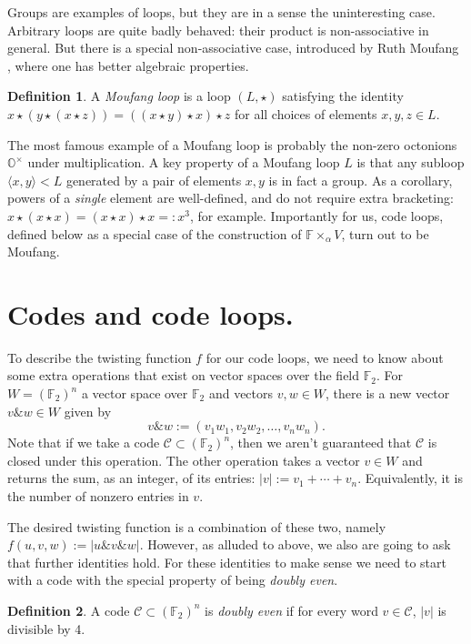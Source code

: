 \documentclass{article}
\theoremstyle{plain}
\theoremstyle{definition}
\newtheorem*{definition}{Definition}
\def \cC {\mathcal{C}}
\def \FF {\mathbb{F}}
\newcommand{\AND}{\mathbin{\texttt{\&}}}
\begin{document}
Groups are examples of loops, but they are in a sense the uninteresting case. Arbitrary loops are quite badly behaved: their product is non-associative in general. But there is a special non-associative case, introduced by Ruth Moufang \cite{Moufang}, where one has better algebraic properties.

\begin{definition}
A \emph{Moufang loop} is a loop $(L,\star)$ satisfying the identity $x \star (y \star (x \star z)) = ((x \star y) \star x) \star z$ for all choices of elements $x,y,z\in L$.
\end{definition}

The most famous example of a Moufang loop is probably the non-zero octonions $\mathbb{O}^\times$ under multiplication. A key property of a Moufang loop $L$ is that any subloop $\langle x,y\rangle < L$ generated by a pair of elements $x,y$ is in fact a group. As a corollary, powers of a \emph{single} element are well-defined, and do not require extra bracketing: $x\star (x \star x) = (x\star x) \star x =: x^3$, for example. Importantly for us, code loops, defined below as a special case of the construction of $\FF\times_\alpha V$, turn out to be Moufang.



\section{Codes and code loops.}

To describe the twisting function $f$ for our code loops, we need to know about some extra operations that exist on vector spaces over the field $\FF_2$. 
For $W=(\FF_2)^n$ a vector space over $\FF_2$ and vectors $v,w\in W$, there is a new vector $v\AND w \in W$ given by
\[
	v\AND w := (v_1w_1,v_2w_2,\ldots,v_nw_n).
\]
Note that if we take a code $\cC \subset (\FF_2)^n$, then we aren't guaranteed that $\cC$ is closed under this operation.
The other operation takes a vector $v\in W$ and returns the sum, as an integer, of its entries: $|v| := v_1 + \cdots + v_n$. Equivalently, it is the number of nonzero entries in $v$.

The desired twisting function is a combination of these two, namely $f(u,v,w) := |u\AND v\AND w|$.
However, as alluded to above, we also are going to ask that further identities hold. 
For these identities to make sense we need to start with a code with the special property of being \emph{doubly even}.

\begin{definition}
A code $\cC \subset (\FF_2)^n$ is \emph{doubly even} if for every word $v\in \cC$, $|v|$ is divisible by 4. 
\end{definition}
\end{document}
